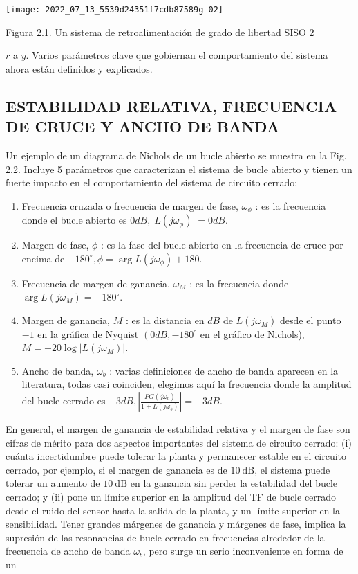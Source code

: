 \texttt{[image: 2022\_07\_13\_5539d24351f7cdb87589g-02]}

Figura 2.1. Un sistema de retroalimentación de grado de libertad SISO 2

$r$ a $y$. Varios parámetros clave que gobiernan el comportamiento del sistema ahora están definidos y explicados.

\subsection{ESTABILIDAD RELATIVA, FRECUENCIA DE CRUCE Y ANCHO DE BANDA}
Un ejemplo de un diagrama de Nichols de un bucle abierto se muestra en la Fig. 2.2. Incluye 5 parámetros que caracterizan el sistema de bucle abierto y tienen un fuerte impacto en el comportamiento del sistema de circuito cerrado:

\begin{enumerate}
  \item Frecuencia cruzada o frecuencia de margen de fase, $\omega_{\phi}$ : es la frecuencia donde el bucle abierto es $0 d B,\left| L\left(j \omega_{\phi}\right)\right|=0 d B$.

  \item Margen de fase, $\phi$ : es la fase del bucle abierto en la frecuencia de cruce por encima de $-180^{\circ}, \phi=\arg L\left(j \omega_{\phi}\right)+180$.

  \item Frecuencia de margen de ganancia, $\omega_{M}$ : es la frecuencia donde $\arg L\left(j \omega_{M}\right)=-180^{\circ}$.

  \item Margen de ganancia, $M$ : es la distancia en $d B$ de $L\left(j \omega_{M}\right)$ desde el punto $-1$ en la gráfica de Nyquist $\left(0 d B,-180^{\circ}\right.$ en el gráfico de Nichols), $M=-20 \log \left| L\left(j \omega_{M}\right)\right|$.

  \item Ancho de banda, $\omega_{b}$ : varias definiciones de ancho de banda aparecen en la literatura, todas casi coinciden, elegimos aquí la frecuencia donde la amplitud del bucle cerrado es $-3 d B,\left|\frac{P G\left(j \omega_{b}\right)}{1+L\left(j \omega_{b}\right)}\right|=-3 d B$.

\end{enumerate}
En general, el margen de ganancia de estabilidad relativa y el margen de fase son cifras de mérito para dos aspectos importantes del sistema de circuito cerrado: (i) cuánta incertidumbre puede tolerar la planta y permanecer estable en el circuito cerrado, por ejemplo, si el margen de ganancia es de $10 \mathrm{~dB}$, el sistema puede tolerar un aumento de $10 \mathrm{~dB}$ en la ganancia sin perder la estabilidad del bucle cerrado; y (ii) pone un límite superior en la amplitud del TF de bucle cerrado desde el ruido del sensor hasta la salida de la planta, y un límite superior en la sensibilidad. Tener grandes márgenes de ganancia y márgenes de fase, implica la supresión de las resonancias de bucle cerrado en frecuencias alrededor de la frecuencia de ancho de banda $\omega_{b}$, pero surge un serio inconveniente en forma de un

